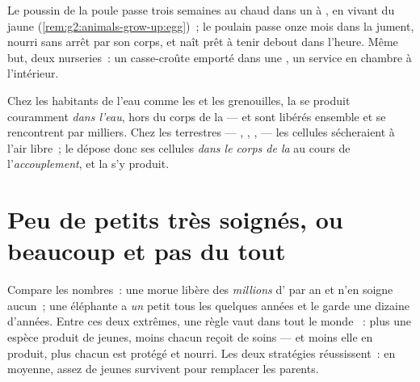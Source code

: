 \begin{example}\label{ex:g4:animal-reproduction:nurseries}
Le poussin de la poule passe trois semaines au chaud dans un  à
, en vivant du jaune
(\cref{rem:g2:animals-grow-up:egg})~; le poulain passe onze mois
dans la jument, nourri sans arrêt par son corps, et naît prêt à
tenir debout dans l'heure. Même but, deux nurseries~: un
casse-croûte emporté dans une , un service en chambre à
l'intérieur.
\end{example}

\begin{proposition}\label{prop:g4:animal-reproduction:where}
Chez les habitants de l'eau comme les  et les grenouilles,
la  se produit couramment \emph{dans l'eau}, hors du
corps de la  ---  et  sont libérés ensemble
et se rencontrent par milliers. Chez les  terrestres ---
, , ,  --- les cellules
sécheraient à l'air libre~; le  dépose donc ses cellules
\emph{dans le corps de la } au cours de
l'\emph{accouplement}, et la  s'y
produit.
\end{proposition}
\admitted

\section{Peu de petits très soignés, ou beaucoup et pas du tout}

\begin{proposition}\label{prop:g4:animal-reproduction:strategies}
Compare les nombres~: une morue libère des \emph{millions} d'
par an et n'en soigne aucun~; une éléphante a \emph{un} petit tous
les quelques années et le garde une dizaine d'années. Entre ces deux
extrêmes, une règle vaut dans tout le monde ~: plus une espèce
produit de jeunes, moins chacun reçoit de soins --- et moins elle en
produit, plus chacun est protégé et nourri. Les deux stratégies
réussissent~: en moyenne, assez de jeunes survivent pour remplacer
les parents.
\end{proposition}
\admitted

